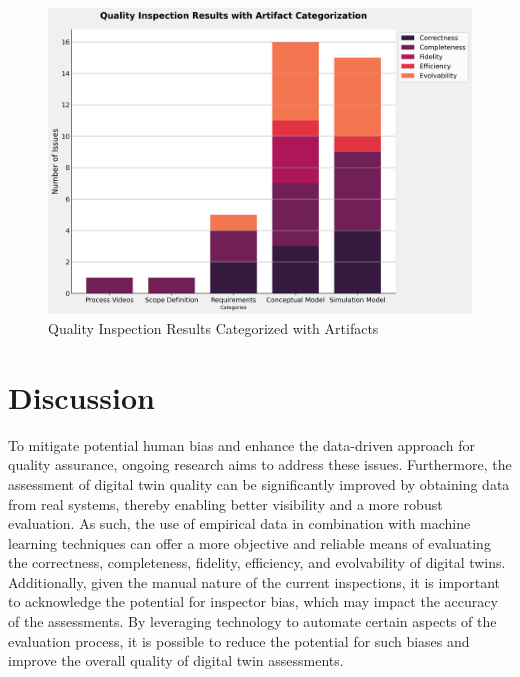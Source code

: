 \documentclass{llncs}
\begin{document}
    \begin{figure}[htbp]
        \includegraphics[scale = 0.40]{quality_inspection_results_with_artifacts.png}
        \caption{ Quality Inspection Results Categorized with Artifacts}
        \label{fig:QualityInspectonResultsWithArtifacts}
    \end{figure}

    \section{Discussion}
    \label{section:framework_1}
    To mitigate potential human bias and enhance the data-driven approach for quality assurance, ongoing research aims to address these issues. 
    Furthermore, the assessment of digital twin quality can be significantly improved by obtaining data from real systems, thereby enabling better visibility and a more robust evaluation. As such, the use of empirical data in combination with machine learning techniques can offer a more objective and reliable means of evaluating the correctness, completeness, fidelity, efficiency, and evolvability of digital twins. Additionally, given the manual nature of the current inspections, it is important to acknowledge the potential for inspector bias, which may impact the accuracy of the assessments. 
    By leveraging technology to automate certain aspects of the evaluation process, it is possible to reduce the potential for such biases and improve the overall quality of digital twin assessments.
    
\end{document}
